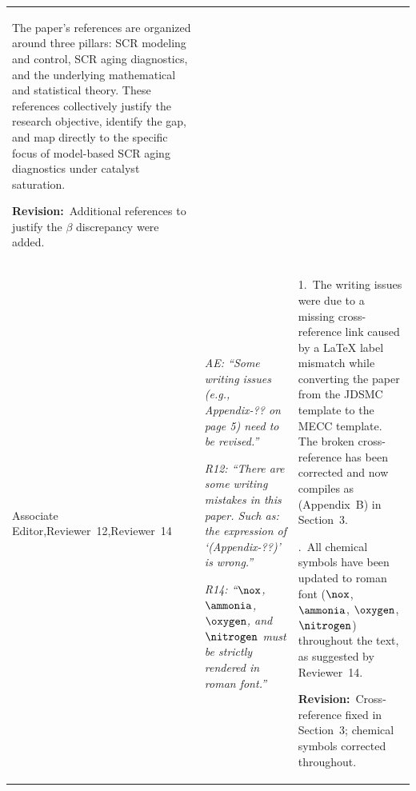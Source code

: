 \documentclass[letterpaper, 10pt]{article}
\newcommand{\rquote}[1]{\textcolor{reviewtext}{\emph{#1}}}
\newcommand{\revision}[1]{\par\smallskip\textcolor{revisioncolor}{\textbf{Revision:}~#1}}
\begin{document}
\begin{longtable}{
    >{\raggedright\arraybackslash\small}p{}
    >{\small}p{}
    >{\small}p{}}
    The paper's references are organized around three pillars: SCR modeling and control, SCR aging diagnostics, and the
    underlying mathematical and statistical theory. These references collectively justify the research objective,
    identify the gap, and map directly to the specific focus of model-based SCR aging diagnostics under catalyst
    saturation.
    \revision{Additional references to justify the $\beta$ discrepancy were added.}
    \\ \arrayrulecolor{rowsep}\midrule\arrayrulecolor{black}
    Associate Editor,\newline Reviewer~12,\newline Reviewer~14
                               &
    \rquote{AE: ``Some writing issues (e.g., Appendix-?? on page 5) need to be revised.''}
    \par\medskip
    \rquote{R12: ``There are some writing mistakes in this paper. Such as: the expression of `(Appendix-??)' is wrong.''}
    \par\medskip
    \rquote{R14: ``$\nox$, $\ammonia$, $\oxygen$, and $\nitrogen$ must be strictly rendered in roman font.''}
                               &
    1.~The writing issues were due to a missing cross-reference link caused by a LaTeX label mismatch while converting
    the paper from the JDSMC template to the MECC template. The broken cross-reference has been corrected and now
    compiles as (Appendix~B) in Section~3.
    \par\smallskip
    2.~All chemical symbols have been updated to roman font ($\nox$, $\ammonia$, $\oxygen$, $\nitrogen$) throughout the
    text, as suggested by Reviewer~14.
    \revision{Cross-reference fixed in Section~3; chemical symbols corrected throughout.}
    \\ \bottomrule
\end{longtable}
\end{document}
